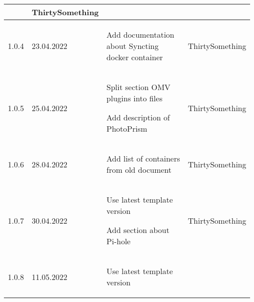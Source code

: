 \begin{tiny}
\begin{longtable}{ | p{} | p{} | P{0.49\textwidth} | p{0.15\textwidth} | }
                                 &
        ThirtySomething            \\
        \hline
        1.0.4                    &
        23.04.2022               &
        \begin{tsLTItemize}
            \item Add documentation about Syncting docker container
        \end{tsLTItemize}
                                 &
        ThirtySomething            \\
        \hline
        1.0.5                    &
        25.04.2022               &
        \begin{tsLTItemize}
            \item Split section OMV plugins into files
            \item Add description of PhotoPrism
        \end{tsLTItemize}
                                 &
        ThirtySomething            \\
        \hline
        1.0.6                    &
        28.04.2022               &
        \begin{tsLTItemize}
            \item Add list of containers from old document
        \end{tsLTItemize}
                                 &
        ThirtySomething            \\
        \hline
        1.0.7                    &
        30.04.2022               &
        \begin{tsLTItemize}
            \item Use latest template version
            \item Add section about Pi-hole
        \end{tsLTItemize}
                                 &
        ThirtySomething            \\
        \hline
        1.0.8                    &
        11.05.2022               &
        \begin{tsLTItemize}
            \item Use latest template version

\end{tsLTItemize}
\end{longtable}
\end{tiny}
